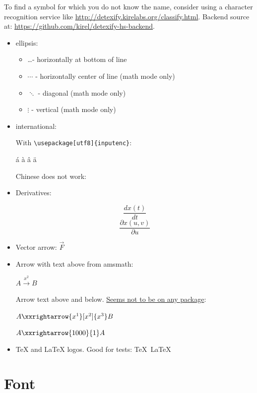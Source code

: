 \documentclass[12pt]{article}
\begin{document}
  To find a symbol for which you do not know the name,
  consider using a character recognition service like \url{http://detexify.kirelabs.org/classify.html}.
  Backend source at: \url{https://github.com/kirel/detexify-hs-backend}.

  \begin{itemize}

    \item ellipsis:

      \begin{itemize}
        \item  \ldots   - horizontally at bottom of line
        \item  $\cdots$ - horizontally center of line (math mode only)
        \item  $\ddots$ - diagonal (math mode only)
        \item  $\vdots$ - vertical (math mode only)
      \end{itemize}

    \item international:

      With \lstinline|\usepackage[utf8]{inputenc}|:

      á à â ä

      Chinese does not work: %

    \item Derivatives:

      $$ \frac{dx(t)}{dt} $$
      $$ \frac{\partial x(u,v)}{\partial u} $$

    \item Vector arrow: $\vec{F}$

    \item Arrow with text above from amsmath:

        $A\xrightarrow{x^2}B$

      Arrow text above and below. \href{http://tex.stackexchange.com/questions/27545/custom-length-arrows-text-over-and-under}{Seems not to be on any package}:

        $A\xxrightarrow{x^1}[x^2]{x^3}B$

        $A\xxrightarrow{1000}{1}A$

    \item TeX and LaTeX logos. Good for tests: \TeX\ \LaTeX
  \end{itemize}

\section{Font}\label{font}
\end{document}
